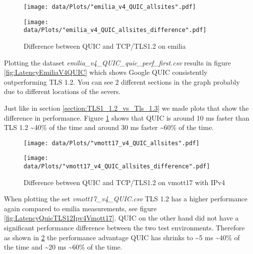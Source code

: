 \begin{figure}[!thb]
	\centering
	\begin{minipage}{.45\textwidth}
		\centering
		\texttt{[image: data/Plots/"emilia\_v4\_QUIC\_allsites".pdf]}
		\caption{Latency of QUIC and TLS 1.2 from 267 websites measured over several days on emilia}
  		\label{fig:LatencyEmiliaV4QUIC}
  	\end{minipage}%
  	\hspace{0.5cm}
  	\begin{minipage}{.45\textwidth}
		\centering
		\texttt{[image: data/Plots/"emilia\_v4\_QUIC\_allsites\_difference".pdf]}
		\caption{Difference between QUIC and TCP/TLS1.2 on emilia}
  		\label{fig:DiffQuicTLS12}
  	\end{minipage}
\end{figure}
Plotting the dataset \textit{emilia\_v4\_QUIC\_quic\_perf\_first.csv} results in figure \ref{fig:LatencyEmiliaV4QUIC} which shows Google QUIC consistently outperforming TLS 1.2.
You can see 2 different sections in the graph probably due to different locations of the severs. 

Just like in section \ref{section:TLS1_1.2_vs_Tls_1.3} we made plots that show the difference in performance.
Figure \ref{fig:DiffQuicTLS12} shows that QUIC is around 10 ms  faster than TLS 1.2 \textasciitilde 40\% of the time and around 30 ms faster \textasciitilde 60\% of the time.


\begin{figure}[!thb]
	\centering
	\begin{minipage}{.45\textwidth}
		\centering
		\texttt{[image: data/Plots/"vmott17\_v4\_QUIC\_allsites".pdf]}
		\caption{Latency of QUIC and TCP/TLS1.2 on vmott17 with IPv4}
  		\label{fig:LatencyQuicTLS12Ipv4Vmott17}
  		\centering
  	\end{minipage}%
  	\hspace{0.5cm}
  	\begin{minipage}{.45\textwidth}
  		\centering
  		\texttt{[image: data/Plots/"vmott17\_v4\_QUIC\_allsites\_difference".pdf]}
		\caption{Difference between QUIC and TCP/TLS1.2 on vmott17 with IPv4}
  		\label{fig:DiffQuicTLS12Ipv4Vmott17}
  	\end{minipage}
\end{figure}

When plotting the set \textit{vmott17\_v4\_QUIC.csv} TLS 1.2 has a higher performance again compared to emilia measurements, see figure \ref{fig:LatencyQuicTLS12Ipv4Vmott17}.
QUIC on the other hand did not have a significant performance difference between the two test environments.
Therefore as shown in \ref{fig:DiffQuicTLS12Ipv4Vmott17} the performance advantage QUIC has shrinks to \textasciitilde 5 ms \textasciitilde 40\% of the time and \textasciitilde 20 ms \textasciitilde 60\% of the time.


